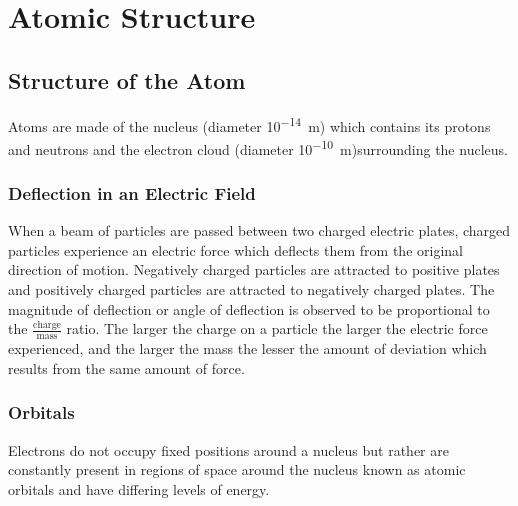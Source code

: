 \documentclass[../main]{subfiles}
\begin{document}
\section{Atomic Structure}

	\subsection{Structure of the Atom}

	Atoms are made of the nucleus (diameter \si{10^{-14}m}) which contains its protons and neutrons and the electron cloud  (diameter \si{10^{-10}m})surrounding the nucleus.

	\subsubsection{Deflection in an Electric Field}

	When a beam of particles are passed between two charged electric plates, charged particles experience an electric force which deflects them from the original direction of motion. Negatively charged particles are attracted to positive plates and positively charged particles are attracted to negatively charged plates. The magnitude of deflection or angle of deflection is observed to be proportional to the \(\frac{\text{charge}}{\text{mass}}\) ratio. The larger the charge on a particle the larger the electric force experienced, and the larger the mass the lesser the amount of deviation which results from the same amount of force.

	\subsubsection{Orbitals}

	Electrons do not occupy fixed positions around a nucleus but rather are constantly present in regions of space around the nucleus known as atomic orbitals and have differing levels of energy.


\end{document}
